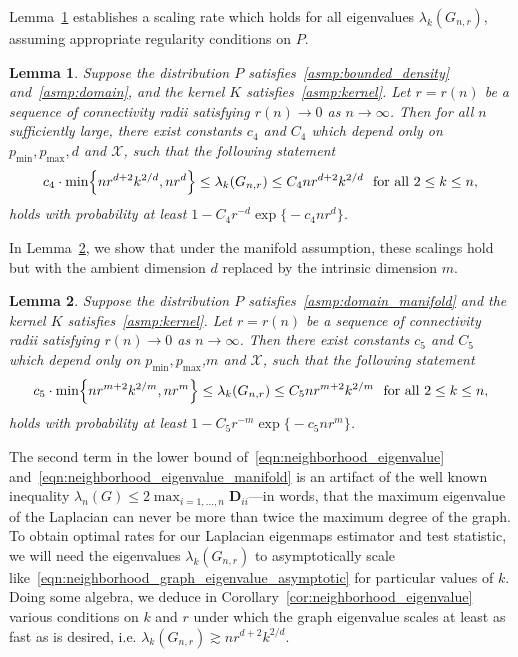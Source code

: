\documentclass{article}
\newcommand{\1}{\mathbf{1}}
\newcommand{\Xset}{\mathcal{X}}
\theoremstyle{alden}
\theoremstyle{aldenthm}
\newtheorem{lemma}{Lemma}
\theoremstyle{definition}
\theoremstyle{remark}
\begin{document}
Lemma~\ref{lem:neighborhood_eigenvalue} establishes a scaling rate which holds for all eigenvalues $\lambda_{k}(G_{n,r})$, assuming appropriate regularity conditions on $P$.
\begin{lemma}
	\label{lem:neighborhood_eigenvalue}
	Suppose the distribution $P$ satisfies~\ref{asmp:bounded_density} and~\ref{asmp:domain}, and the kernel $K$ satisfies~\ref{asmp:kernel}. Let $r = r(n)$ be a sequence of connectivity radii satisfying $r(n) \to 0$ as $n \to \infty$. Then for all $n$ sufficiently large, there exist constants $c_4$ and $C_4$ which depend only on $p_{\min}, p_{\max},d$ and $\Xset$, such that the following statement
	\begin{equation}
	\label{eqn:neighborhood_eigenvalue}
	c_4 \cdot \min\Bigl\{nr^{d + 2}k^{2/d}, nr^d\Bigr\} \leq \lambda_k(G_{n,r}) \leq C_4 nr^{d + 2}k^{2/d}~~\textrm{for all $2 \leq k \leq n$,}
	\end{equation}	
	holds with probability at least $1 - C_4 r^{-d} \exp\bigl\{- c_4 n r^d\bigr\}$.
\end{lemma}
In Lemma~\ref{lem:neighborhood_eigenvalue_manifold}, we show that under the manifold assumption, these scalings hold but with the ambient dimension $d$ replaced by the intrinsic dimension $m$.
\begin{lemma}
	\label{lem:neighborhood_eigenvalue_manifold}
	Suppose the distribution $P$ satisfies~\ref{asmp:domain_manifold} and the kernel $K$ satisfies~\ref{asmp:kernel}. Let $r = r(n)$ be a sequence of connectivity radii satisfying $r(n) \to 0$ as $n \to \infty$. Then there exist constants $c_5$ and $C_5$ which depend only on $p_{\min}, p_{\max}$,$m$ and $\Xset$, such that the following statement 
	\begin{equation}
	\label{eqn:neighborhood_eigenvalue_manifold}
	 c_5 \cdot \min\Bigl\{nr^{m + 2}k^{2/m}, nr^m\Bigr\} \leq \lambda_k(G_{n,r}) \leq C_5 nr^{m + 2}k^{2/m}~~\textrm{for all $2 \leq k \leq n$,}
	\end{equation}	
	holds with probability at least $1 - C_5 r^{-m} \exp\bigl\{- c_5 n r^m\bigr\}$.
\end{lemma}


The second term in the lower bound of~\eqref{eqn:neighborhood_eigenvalue} and~\eqref{eqn:neighborhood_eigenvalue_manifold} is an artifact of the well known inequality $\lambda_n(G) \leq 2 \max_{i = 1,\ldots,n} \mathbf{D}_{ii}$---in words, that the maximum eigenvalue of the Laplacian can never be more than twice the maximum degree of the graph. To obtain optimal rates for our Laplacian eigenmaps estimator and test statistic, we will need the eigenvalues $\lambda_k(G_{n,r})$ to asymptotically scale like~\eqref{eqn:neighborhood_graph_eigenvalue_asymptotic} for particular values of $k$. Doing some algebra, we deduce in Corollary~\ref{cor:neighborhood_eigenvalue} various conditions on $k$ and $r$ under which the graph eigenvalue scales at least as fast as is desired, i.e. $\lambda_k(G_{n,r}) \gtrsim n r^{d + 2}k^{2/d}$. 
\end{document}
